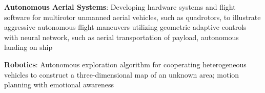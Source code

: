 \documentclass[10pt]{article}
\begin{document}
\begin{list}{}

\item \textbf{Autonomous Aerial Systems}: Developing hardware systems and flight software for multirotor unmanned aerial vehicles, such as quadrotors, to illustrate aggressive autonomous flight maneuvers utilizing geometric adaptive controls with neural network, such as aerial transportation of payload, autonomous landing on ship

\item \textbf{Robotics}: Autonomous exploration algorithm for cooperating heterogeneous vehicles to construct a three-dimensional map of an unknown area; motion planning with emotional awareness

\end{list}


\end{document}
